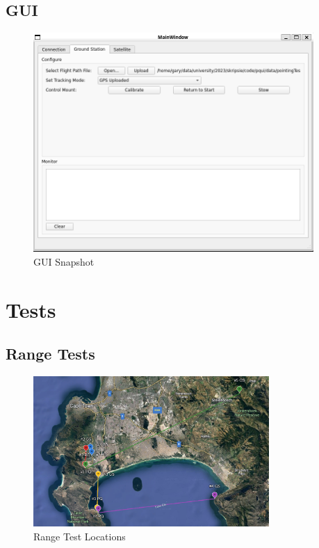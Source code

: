 \section{GUI}\label{sec:appendix_gui}
\begin{figure}[!htb]
  \centering
  \includegraphics[width=0.95\textwidth]{guiSnapshot1}
  \caption{GUI Snapshot}
  \label{fig:guiSnapshot}
\end{figure}

\chapter{Tests}
\section{Range Tests}\label{sec:appendix_range}
\begin{figure}[!htb]
  \centering
  \includegraphics[width=0.8\textwidth]{rangeTests}
  \caption{Range Test Locations}
  \label{fig:rangeTests}
\end{figure}